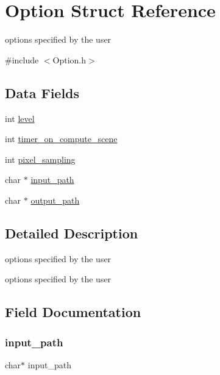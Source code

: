 \hypertarget{struct_option}{}\section{Option Struct Reference}
\label{struct_option}


options specified by the user  




{\ttfamily \#include $<$Option.\+h$>$}

\subsection*{Data Fields}
\begin{DoxyCompactItemize}
\item 
int \hyperlink{struct_option_acf4d33ee4cff36f69b924471174dcb11}{level}
\item 
int \hyperlink{struct_option_a55a22286c25bb0d604e9425da1c0c121}{timer\+\_\+on\+\_\+compute\+\_\+scene}
\item 
int \hyperlink{struct_option_ad7146066ca84f44322c4b8b9b0cf68b3}{pixel\+\_\+sampling}
\item 
char $\ast$ \hyperlink{struct_option_ae034085e87d427c78144ccce961ee56f}{input\+\_\+path}
\item 
char $\ast$ \hyperlink{struct_option_a73c330e3842fe255aa5e7d82bf573289}{output\+\_\+path}
\end{DoxyCompactItemize}


\subsection{Detailed Description}
options specified by the user 

options specified by the user 

\subsection{Field Documentation}
\mbox{\label{struct_option_ae034085e87d427c78144ccce961ee56f}} 
\subsubsection{\texorpdfstring{input\+\_\+path}{input\_path}}
{\footnotesize\ttfamily char$\ast$ input\+\_\+path}

